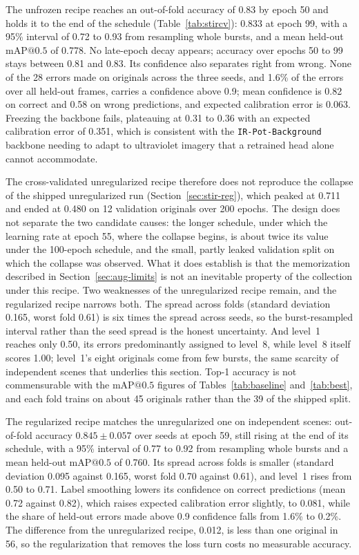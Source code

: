 ﻿\documentclass[journal]{IEEEtran}
\begin{document}
The unfrozen recipe reaches an out-of-fold accuracy of 0.83 by epoch 50 and holds it to the end of the schedule (Table~\ref{tab:stircv}): 0.833 at epoch 99, with a 95\% interval of 0.72 to 0.93 from resampling whole bursts, and a mean held-out $\text{mAP@0.5}$ of 0.778. No late-epoch decay appears; accuracy over epochs 50 to 99 stays between 0.81 and 0.83. Its confidence also separates right from wrong. None of the 28 errors made on originals across the three seeds, and 1.6\% of the errors over all held-out frames, carries a confidence above 0.9; mean confidence is 0.82 on correct and 0.58 on wrong predictions, and expected calibration error is 0.063. Freezing the backbone fails, plateauing at 0.31 to 0.36 with an expected calibration error of 0.351, which is consistent with the \texttt{IR-Pot-Background} backbone needing to adapt to ultraviolet imagery that a retrained head alone cannot accommodate.

The cross-validated unregularized recipe therefore does not reproduce the collapse of the shipped unregularized run (Section~\ref{sec:stir-reg}), which peaked at 0.711 and ended at 0.480 on 12 validation originals over 200 epochs. The design does not separate the two candidate causes: the longer schedule, under which the learning rate at epoch 55, where the collapse begins, is about twice its value under the 100-epoch schedule, and the small, partly leaked validation split on which the collapse was observed. What it does establish is that the memorization described in Section~\ref{sec:aug-limits} is not an inevitable property of the collection under this recipe. Two weaknesses of the unregularized recipe remain, and the regularized recipe narrows both. The spread across folds (standard deviation 0.165, worst fold 0.61) is six times the spread across seeds, so the burst-resampled interval rather than the seed spread is the honest uncertainty. And level~1 reaches only 0.50, its errors predominantly assigned to level~8, while level~8 itself scores 1.00; level~1's eight originals come from few bursts, the same scarcity of independent scenes that underlies this section. Top-1 accuracy is not commensurable with the $\text{mAP@0.5}$ figures of Tables~\ref{tab:baseline} and~\ref{tab:best}, and each fold trains on about 45 originals rather than the 39 of the shipped split.

The regularized recipe matches the unregularized one on independent scenes: out-of-fold accuracy $0.845 \pm 0.057$ over seeds at epoch 59, still rising at the end of its schedule, with a 95\% interval of 0.77 to 0.92 from resampling whole bursts and a mean held-out $\text{mAP@0.5}$ of 0.760. Its spread across folds is smaller (standard deviation 0.095 against 0.165, worst fold 0.70 against 0.61), and level~1 rises from 0.50 to 0.71. Label smoothing lowers its confidence on correct predictions (mean 0.72 against 0.82), which raises expected calibration error slightly, to 0.081, while the share of held-out errors made above 0.9 confidence falls from 1.6\% to 0.2\%. The difference from the unregularized recipe, 0.012, is less than one original in 56, so the regularization that removes the loss turn costs no measurable accuracy.
\end{document}
